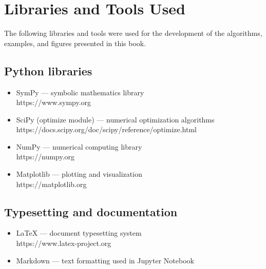 \documentclass[11pt]{article}
\begin{document}
    \section{Libraries and Tools Used}\label{libraries-and-tools-used}

The following libraries and tools were used for the development of the
algorithms, examples, and figures presented in this book.

\subsection{Python libraries}\label{python-libraries}

\begin{itemize}
\item
  SymPy --- symbolic mathematics library\\
  https://www.sympy.org
\item
  SciPy (optimize module) --- numerical optimization algorithms\\
  https://docs.scipy.org/doc/scipy/reference/optimize.html
\item
  NumPy --- numerical computing library\\
  https://numpy.org
\item
  Matplotlib --- plotting and visualization\\
  https://matplotlib.org
\end{itemize}

\subsection{Typesetting and
documentation}\label{typesetting-and-documentation}

\begin{itemize}
\item
  LaTeX --- document typesetting system\\
  https://www.latex-project.org
\item
  Markdown --- text formatting used in Jupyter Notebook
\end{itemize}


    
    
    
\end{document}
